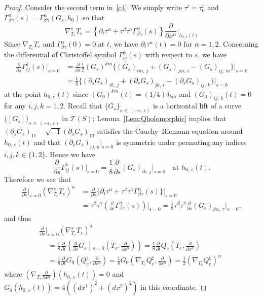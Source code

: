 \documentclass[11pt]{article}
\theoremstyle{definition}
\numberwithin{equation}{section}
\renewcommand{\a}{\alpha}
\renewcommand{\b}{\beta}
\newcommand{\g}{\gamma}
\renewcommand{\t}{\tau}
\newcommand{\e}{\varepsilon}
\newcommand{\p}{\psi}
\newcommand{\Tc}{\mathcal{T}}
\renewcommand*\p{\partial}
\begin{document}
\begin{proof}
Consider the second term in~\eqref{c4}. We simply write $\t^i=\t^i_0$ and $\Gamma_{\beta\gamma}^{\alpha}(s)=\Gamma_{\beta\gamma}^{\alpha}(G_s, h_0)$ so that
\[
\nabla^s_{T_e}T_e=\left\{\p_t\tau^\a+ \tau^\b \tau^\g\Gamma_{\b \g}^\a(s)\right\}\frac{\p}{\p x^\a}\Big|_{h_{0,\,e}(t)}
\]
Since $\nabla_{T_e}T_e$ and $\Gamma_{\b \g}^\a(0)=0$ at $t$, we have $\p_t\tau^\a(t)=0$ for $\a=1,2$. Concerning the differential of Christoffel symbol $\Gamma_{ij}^k(s)$ with respect to $s$, we have
\begin{align*}
\frac{\p}{\p s}\Gamma_{ij}^k(s)\Big|_{s=0}&=\frac{\p}{\p s}\frac{1}{2}(G_s)^{km}\Big\{(G_s)_{im,\,j}+(G_s)_{jm,\,i}-(G_s)_{ij,\,m}\Big\}\Big|_{s=0}\\
&=\frac{1}{8}\Big\{\left(\p_s G_s\right)_{ik,\,j}+\left(\p_s G_s\right)_{jk,\,i}-\left(\p_s G_s\right)_{ij,\,k}\Big\}\Big|_{s=0}\
\end{align*}
at the point $h_{0,\,e}(t)$ since $(G_0)^{km}(t)=(1/4)\delta_{km}$ and $(G_0)_{ij,\,k}(t)=0$ for any $i,j,k=1, 2$. Recall that $\{G_s\}_{s\,\in\,(-\e,\,\e)}$ is a horizontal lift of a curve $\{[G_s]\}_{s\,\in\,(-\e, \,\e)}$ in $\Tc(S)$; Lemma~\ref{Lem:Qholomorphic} implies that $(\p_s G_s)_{11}-\sqrt{-1}(\p_s G_s)_{12}$ satisfies the Cauchy--Riemann equation around $h_{0,\,e}(t)$ and that $(\p_s G_s)_{ij,\,k}|_{s=0}$ is symmetric under permuting any indices $i, j, k \in \{1, 2\}$. Hence we have
\[
\frac{\p}{\p s}\Gamma_{ij}^k(s)\Big|_{s=0} =\frac{1}{8}\frac{\p}{\p s}({G}_s)_{ik,\,j}\Big|_{s=0} \quad \text{at }h_{0,\,e}(t).
\]
Therefore we see that
\begin{align*}
\frac{\p}{\p s}\Big|_{s=0}\left(\nabla^s_{T_e}T_e\right)^{\alpha} &=\frac{\p}{\p s}\Big\{\p_t\tau^\a+\tau^\b \tau^\g\Gamma_{\b \g}^\a(s)\Big\}\Big|_{s=0}\\
&=\tau^\b \tau^\g \left(\frac{\p}{\p s}\Gamma_{\b \g}^\a(s)\right)\Big|_{s=0} =\frac{1}{8}\tau^\b \tau^\g\frac{\p}{\p s}\left({G}_s\right)_{\b\a,\,\g}\Big|_{s=0},
\end{align*}
and thus
\begin{multline}\label{c42}
\frac{\p}{\p s}\Big|_{s=0}\left(\nabla^s_{T_e}T_e\right)^{\alpha}\\
\begin{aligned}
&=\frac{1}{8}\frac{\p}{\p t}\left\{\frac{\p}{\p s}{G}_s\middle|_{s=0}\left(T_e, \frac{\p}{\p x^\a}\right)\right\}=\frac{1}{8}\frac{\p}{\p t}Q_e\left(T_e, \frac{\p}{\p x^\a}\right)\\
&=\frac{1}{8}\frac{\p}{\p t}G_0\left(Q_e^{\sharp}, \frac{\p}{\p x^\a}\right)=\frac{1}{8}G_0\left(\nabla_{T_e} Q_e^{\sharp}, \frac{\p}{\p x^\a}\right)=\frac{1}{2}\left(\nabla_{T_e}Q_e^{\sharp}\right)^{\alpha}
\end{aligned}
\end{multline}
where $(\nabla_{T_e}\frac{\p}{\p x^\a})(h_{0,\, e}(t))=0$ and $G_0(h_{0,\,e}(t))=4((dx^1)^2+(dx^2)^2)$ in this coordinate.



\end{proof}
\end{document}
